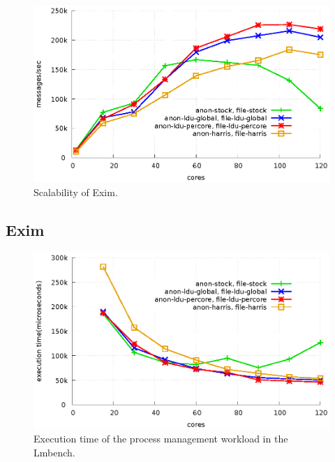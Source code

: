 \begin{figure}[tb]
  \begin{center}
    \includegraphics[scale=0.8]{graph/exim.eps}
  \end{center}
  \caption{Scalability of Exim.}
  \label{fig:exim}
\end{figure}

\subsection{Exim}

\begin{figure}[tb]
  \begin{center}
    \includegraphics[scale=0.8]{graph/lmbench.eps}
  \end{center}
  \caption{Execution time of the process management workload in the Lmbench.}
  \label{fig:MicroBench}
\end{figure}

